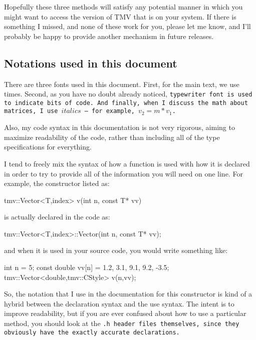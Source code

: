 Hopefully these three methods will satisfy any potential manner in which you might want 
to access the version of TMV that is on your system.  If there is something I missed, and 
none of these work for you, please
let me know, and I'll probably be happy to provide another mechanism in future releases.

\subsection {Notations used in this document}

There are three fonts used in this document.  First, for the main text, we use times.
Second, as you have no doubt already noticed, \tt{typewriter font} is used to 
indicate bits of code.  And finally, when I discuss the math about matrices, I 
use $italics$ -- for example, $v_2 = m * v_1$.

Also, my code syntax in this documentation is not very rigorous, aiming to maximize
readability of the code, rather than including all of the type specifications for everything.

I tend to freely mix the syntax of how a function is used with how
it is declared in order to try to provide all of the information you will need on one line.  
For example, the constructor listed as:
\begin{tmvcode}
tmv::Vector<T,index> v(int n, const T* vv)
\end{tmvcode}
is actually declared in the code as:
\begin{tmvcode}
tmv::Vector<T,index>::Vector(int n, const T* vv);
\end{tmvcode}
and when it is used in your source code, you would write something like:
\begin{tmvcode}
int n = 5;
const double vv[n] = {1.2, 3.1, 9.1, 9.2, -3.5};
tmv::Vector<double,tmv::CStyle> v(n,vv);
\end{tmvcode}
So, the notation that I use in the documentation for this constructor is kind of a hybrid between the declaration syntax and the use syntax.  The intent is to improve readability, but
if you are ever confused about how to use a particular method, you should look at
the \tt{.h} header files themselves, since they obviously have the exactly accurate
declarations.  

